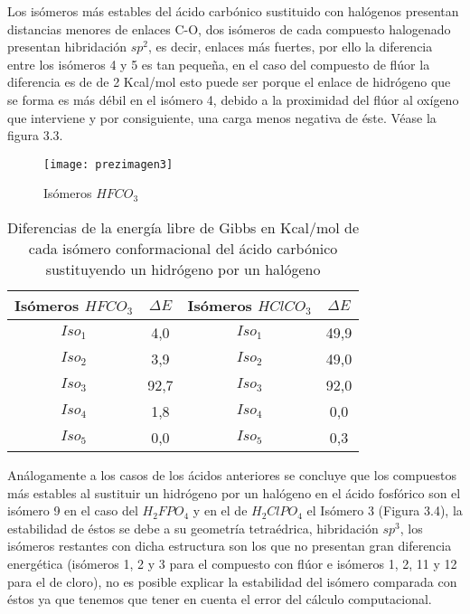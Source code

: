 Los isómeros más estables del ácido carbónico sustituido con halógenos presentan distancias menores de enlaces C-O, dos isómeros de cada compuesto halogenado presentan hibridación $sp^2$, es decir, enlaces más fuertes, por ello la diferencia entre los isómeros 4 y 5 es tan pequeña, en el caso del compuesto de flúor la diferencia es de de 2 Kcal/mol esto puede ser porque el enlace de hidrógeno que se forma es más débil en el isómero 4, debido a la proximidad del flúor al oxígeno que interviene y por consiguiente, una carga menos negativa de éste. Véase la figura 3.3.

\begin{figure}[H]
	\centering
	\texttt{[image: prezimagen3]}
	\caption{Isómeros $HFCO_3$}
\end{figure} 

\begin{table}[H]
	\begin{center}
		\begin{tabular}{|c|c|c|c|}
			\hline 
			Isómeros $HFCO_3$ & $\Delta E$ & Isómeros $HClCO_3$& $\Delta E$ \\ \hline
			$Iso_1$ & 4,0 & $Iso_1$ & 49,9 \\ \hline
			$Iso_2$ & 3,9 & $Iso_2$ & 49,0 \\ \hline
			$Iso_3$ & 92,7 & $Iso_3$ & 92,0 \\ \hline
			$Iso_4$ & 1,8 & $Iso_4$ & 0,0 \\ \hline
			$Iso_5$ & 0,0 & $Iso_5$ & 0,3 \\ \hline
		\end{tabular}
		\caption{Diferencias de la energía libre de Gibbs en Kcal/mol de cada isómero conformacional del ácido carbónico sustituyendo un hidrógeno por un halógeno}
	\end{center}
\end{table}

Análogamente a los casos de los ácidos anteriores se concluye que los compuestos más estables al sustituir un hidrógeno por un halógeno en el ácido fosfórico son el isómero 9 en el caso del $H_2FPO_4$ y en el de $H_2ClPO_4$ el Isómero 3 (Figura 3.4), la estabilidad de éstos se debe a su geometría tetraédrica, hibridación $sp^3$, los isómeros restantes con dicha estructura son los que no presentan gran diferencia energética (isómeros 1, 2 y 3 para el compuesto con flúor e isómeros 1, 2, 11 y 12 para el de cloro), no es posible explicar la estabilidad del isómero comparada con éstos ya que tenemos que tener en cuenta el error del cálculo computacional. 

